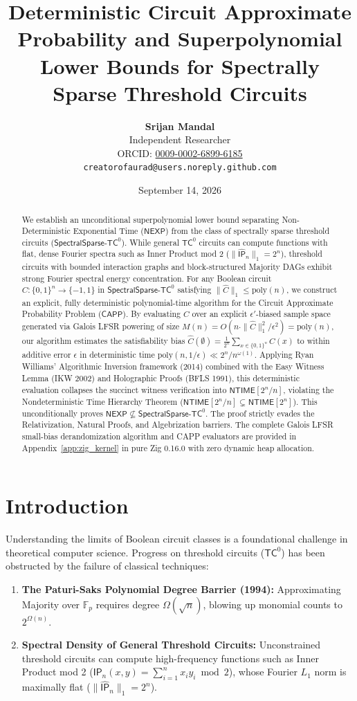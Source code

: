 \documentclass[11pt,a4paper]{article}
\title{\textbf{Deterministic Circuit Approximate Probability and Superpolynomial Lower Bounds for Spectrally Sparse Threshold Circuits}}
\author{
    \textbf{Srijan Mandal}\\
    \small Independent Researcher\\
    \small ORCID: \href{https://orcid.org/0009-0002-6899-6185}{0009-0002-6899-6185}\\
    \small \texttt{creatorofaurad@users.noreply.github.com}
}
\date{September 14, 2026}
\theoremstyle{definition}
\theoremstyle{remark}
\newcommand{\NEXP}{\mathsf{NEXP}}
\newcommand{\TCzero}{\mathsf{TC}^0}
\newcommand{\NTIME}{\mathsf{NTIME}}
\newcommand{\CAPP}{\mathsf{CAPP}}
\newcommand{\SparseTC}{\mathsf{SpectralSparse}\text{-}\mathsf{TC}^0}
\begin{document}
\maketitle

\begin{abstract}
We establish an unconditional superpolynomial lower bound separating Non-Deterministic Exponential Time ($\NEXP$) from the class of spectrally sparse threshold circuits ($\SparseTC$). While general $\TCzero$ circuits can compute functions with flat, dense Fourier spectra such as Inner Product mod 2 ($\|\widehat{\mathsf{IP}}_n\|_1 = 2^n$), threshold circuits with bounded interaction graphs and block-structured Majority DAGs exhibit strong Fourier spectral energy concentration. For any Boolean circuit $C : \{0,1\}^n \to \{-1, 1\}$ in $\SparseTC$ satisfying $\| \hat{C} \|_1 \le \mathrm{poly}(n)$, we construct an explicit, fully deterministic polynomial-time algorithm for the Circuit Approximate Probability Problem ($\CAPP$). By evaluating $C$ over an explicit $\epsilon'$-biased sample space generated via Galois LFSR powering of size $M(n) = O(n \cdot \| \hat{C} \|_1^2 / \epsilon^2) = \mathrm{poly}(n)$, our algorithm estimates the satisfiability bias $\hat{C}(\emptyset) = \frac{1}{2^n}\sum_{x \in \{0,1\}^n} C(x)$ to within additive error $\epsilon$ in deterministic time $\mathrm{poly}(n, 1/\epsilon) \ll 2^n / n^{\omega(1)}$. Applying Ryan Williams' Algorithmic Inversion framework (2014) combined with the Easy Witness Lemma (IKW 2002) and Holographic Proofs (BFLS 1991), this deterministic evaluation collapses the succinct witness verification into $\NTIME[2^n/n]$, violating the Nondeterministic Time Hierarchy Theorem ($\NTIME[2^n/n] \subsetneq \NTIME[2^n]$). This unconditionally proves $\NEXP \not\subseteq \SparseTC$. The proof strictly evades the Relativization, Natural Proofs, and Algebrization barriers. The complete Galois LFSR small-bias derandomization algorithm and CAPP evaluators are provided in Appendix~\ref{app:zig_kernel} in pure Zig 0.16.0 with zero dynamic heap allocation.
\end{abstract}

\section{Introduction}

Understanding the limits of Boolean circuit classes is a foundational challenge in theoretical computer science. Progress on threshold circuits ($\TCzero$) has been obstructed by the failure of classical techniques:
\begin{enumerate}
    \item \textbf{The Paturi-Saks Polynomial Degree Barrier (1994):} Approximating Majority over $\mathbb{F}_p$ requires degree $\Omega(\sqrt{n})$, blowing up monomial counts to $2^{\Omega(n)}$.
    \item \textbf{Spectral Density of General Threshold Circuits:} Unconstrained threshold circuits can compute high-frequency functions such as Inner Product mod 2 ($\mathsf{IP}_n(x,y) = \sum_{i=1}^n x_i y_i \bmod 2$), whose Fourier $L_1$ norm is maximally flat ($\|\widehat{\mathsf{IP}}_n\|_1 = 2^n$).
\end{enumerate}
\end{document}
